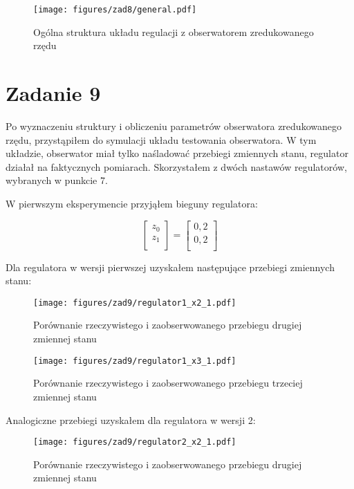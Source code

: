 \documentclass[a4paper,titlepage,11pt,floatssmall]{mwrep}
\begin{document}
\begin{figure}[H]
\centering
\texttt{[image: figures/zad8/general.pdf]}
\caption{Ogólna struktura układu regulacji z obserwatorem zredukowanego rzędu}
\end{figure} 

\section{Zadanie 9}
Po wyznaczeniu struktury i obliczeniu parametrów obserwatora zredukowanego rzędu, przystąpiłem do symulacji układu testowania obserwatora. W tym układzie, obserwator miał tylko naśladować przebiegi zmiennych stanu, regulator działał na faktycznych pomiarach. Skorzystałem z dwóch nastawów regulatorów, wybranych w punkcie 7. 

\indent W pierwszym eksperymencie przyjąłem bieguny regulatora:

\[
\begin{bmatrix}
    z_{0} \\
    z_{1} \\    
\end{bmatrix}
=
\begin{bmatrix}
    0,2 \\
    0,2 \\    
\end{bmatrix}
\]

Dla regulatora w wersji pierwszej uzyskałem następujące przebiegi zmiennych stanu:

\begin{figure}[H]
\centering
\texttt{[image: figures/zad9/regulator1\_x2\_1.pdf]}
\caption{Porównanie rzeczywistego i zaobserwowanego przebiegu drugiej zmiennej stanu}
\end{figure} 

\begin{figure}[H]
\centering
\texttt{[image: figures/zad9/regulator1\_x3\_1.pdf]}
\caption{Porównanie rzeczywistego i zaobserwowanego przebiegu trzeciej zmiennej stanu}
\end{figure} 
\newpage
Analogiczne przebiegi uzyskałem dla regulatora w wersji 2:

\begin{figure}[H]
\centering
\texttt{[image: figures/zad9/regulator2\_x2\_1.pdf]}
\caption{Porównanie rzeczywistego i zaobserwowanego przebiegu drugiej zmiennej stanu}
\end{figure} 
\end{document}
